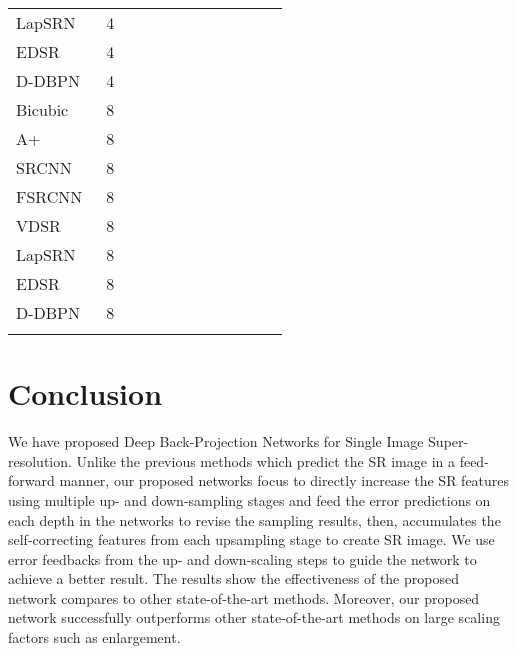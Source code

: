 \documentclass[10pt,twocolumn,letterpaper]{article}
\begin{document}
\begin{table*}[t!]
\begin{tabular}{*1l*1c*2c*2c*2c*2c*2c}
LapSRN~\cite{LapSRN}&4					&&&&&&&&&&\\
EDSR~\cite{Lim_2017_CVPR_Workshops}&4	&{\color{blue}}&{\color{blue}}&{\color{blue}}&{\color{red}}&{\color{blue}}&{\color{red}}&{\color{red}}&{\color{red}}&{\color{blue}}&{\color{red}}\\
D-DBPN &4							&{\color{red}}&{\color{red}}&{\color{red}}&{\color{blue}}&{\color{red}}&{\color{blue}}&{\color{blue}}&{\color{blue}}&{\color{red}}&{\color{blue}}\\
\noalign{\smallskip}\hline\noalign{\smallskip}
Bicubic&8								&&&&&&&&&&\\
A+~\cite{timofte2014a+}&8					&&&&&&&&&&\\
SRCNN~\cite{dong2016image}&8			&&&&&&&&&&\\
FSRCNN~\cite{dong2016accelerating}&8		&&&&&&&&&&\\
VDSR~\cite{Kim_2016_VDSR}&8			&&&&&&&&&&\\
LapSRN~\cite{LapSRN}&8					&&&&&&&&&&\\
EDSR~\cite{Lim_2017_CVPR_Workshops}&8	&{\color{blue}}&{\color{blue}}&{\color{blue}}&{\color{blue}}&{\color{blue}}&{\color{blue}}&{\color{blue}}&{\color{blue}}&{\color{blue}}&{\color{blue}}\\
D-DBPN &8							&{\color{red}}&{\color{red}}&{\color{red}}&{\color{red}}&{\color{red}}&{\color{red}}&{\color{red}}&{\color{red}}&{\color{red}}&{\color{red}}\\
\noalign{\smallskip}\hline
\end{tabular}
\end{table*}

\section{Conclusion}
We have proposed Deep Back-Projection Networks for Single Image Super-resolution. Unlike the previous methods which predict the SR image in a feed-forward manner, our proposed networks focus to directly increase the SR features using multiple up- and down-sampling stages and feed the error predictions on each depth in the networks to revise the sampling results, then, accumulates the self-correcting features from each upsampling stage to create SR image. We use error feedbacks from the up- and down-scaling steps to guide the network to achieve a better result. The results show the effectiveness of the proposed network compares to other state-of-the-art methods.  Moreover, our proposed network successfully outperforms other state-of-the-art methods on large scaling factors such as  enlargement. 





{\small


}
\end{document}
